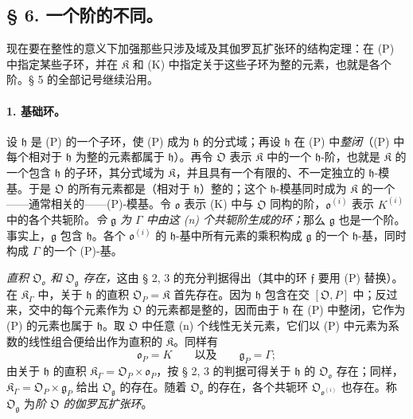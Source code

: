 \subsection*{\S{} 6. 一个阶的不同。}

现在要在整性的意义下加强那些只涉及域及其伽罗瓦扩张环的结构定理：在 (P) 中指定某些子环，并在 \(\mathfrak K\) 和 (K) 中指定关于这些子环为整的元素，也就是各个阶。§ 5 的全部记号继续沿用。

\paragraph{1. 基础环。}
设 \(\mathfrak h\) 是 (P) 的一个子环，使 (P) 成为 \(\mathfrak h\) 的分式域；再设 \(\mathfrak h\) 在 (P) 中\emph{整闭}（(P) 中每个相对于 \(\mathfrak h\) 为整的元素都属于 \(\mathfrak h\)）。再令 \(\mathfrak O\) 表示 \(\mathfrak K\) 中的一个 \(\mathfrak h\)-阶，也就是 \(\mathfrak K\) 的一个包含 \(\mathfrak h\) 的子环，其分式域为 \(\mathfrak K\)，并且具有一个有限的、不一定独立的 \(\mathfrak h\)-模基。于是 \(\mathfrak O\) 的所有元素都是（相对于 \(\mathfrak h\)）整的；这个 \(\mathfrak h\)-模基同时成为 \(\mathfrak K\) 的一个——通常相关的——(P)-模基。令 \(\mathfrak o\) 表示 (K) 中与 \(\mathfrak O\) 同构的阶，\(\mathfrak o^{(i)}\) 表示 \(K^{(i)}\) 中的各个共轭阶。\emph{令 \(\mathfrak g\) 为 \(\Gamma\) 中由这 (n) 个共轭阶生成的环；}那么 \(\mathfrak g\) 也是一个阶。事实上，\(\mathfrak g\) 包含 \(\mathfrak h\)。各个 \(\mathfrak o^{(i)}\) 的 \(\mathfrak h\)-基中所有元素的乘积构成 \(\mathfrak g\) 的一个 \(\mathfrak h\)-基，同时构成 \(\Gamma\) 的一个 (P)-基。

\emph{直积 \(\mathfrak O_{\mathfrak o}\) 和 \(\mathfrak O_{\mathfrak g}\) 存在，}这由 § 2, 3 的充分判据得出（其中的环 \(\mathfrak f\) 要用 (P) 替换）。在 \(\mathfrak K_\Gamma\) 中，关于 \(\mathfrak h\) 的直积 \(\mathfrak O_P=\mathfrak K\) 首先存在。因为 \(\mathfrak h\) 包含在交 \([\mathfrak O,P]\) 中；反过来，交中的每个元素作为 \(\mathfrak O\) 的元素都是整的，因而由于 \(\mathfrak h\) 在 (P) 中整闭，它作为 (P) 的元素也属于 \(\mathfrak h\)。取 \(\mathfrak O\) 中任意 (n) 个线性无关元素，它们以 (P) 中元素为系数的线性组合便给出作为直积的 \(\mathfrak K\)。同样有
\[
\mathfrak o_P=K
\qquad\text{以及}\qquad
\mathfrak g_P=\Gamma;
\]
由关于 \(\mathfrak h\) 的直积 \(\mathfrak K_\Gamma=\mathfrak O_P\times\mathfrak o_P\)，按 § 2, 3 的判据可得关于 \(\mathfrak h\) 的 \(\mathfrak O_{\mathfrak o}\) 存在；同样，\(\mathfrak K_\Gamma=\mathfrak O_P\times\mathfrak g_P\) 给出 \(\mathfrak O_{\mathfrak g}\) 的存在。随着 \(\mathfrak O_{\mathfrak o}\) 的存在，各个共轭环 \(\mathfrak O_{\mathfrak o^{(i)}}\) 也存在。称 \(\mathfrak O_{\mathfrak g}\) 为\emph{阶 \(\mathfrak O\) 的伽罗瓦扩张环}。

